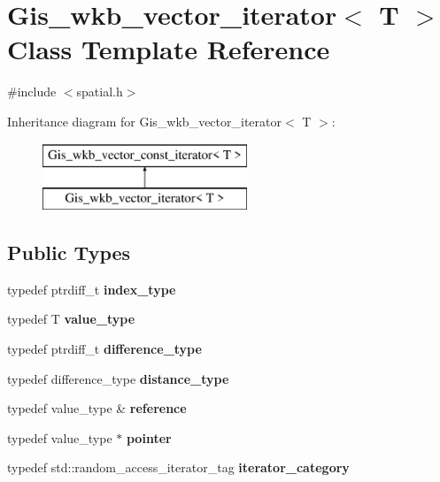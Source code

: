 \hypertarget{classGis__wkb__vector__iterator}{}\section{Gis\+\_\+wkb\+\_\+vector\+\_\+iterator$<$ T $>$ Class Template Reference}
\label{classGis__wkb__vector__iterator}


{\ttfamily \#include $<$spatial.\+h$>$}

Inheritance diagram for Gis\+\_\+wkb\+\_\+vector\+\_\+iterator$<$ T $>$\+:\begin{figure}[H]
\begin{center}
\leavevmode
\includegraphics[height=2.000000cm]{classGis__wkb__vector__iterator}
\end{center}
\end{figure}
\subsection*{Public Types}
\begin{DoxyCompactItemize}
\item 
\mbox{\label{classGis__wkb__vector__iterator_a12ac1d1af0833c06145cc64739daa482}} 
typedef ptrdiff\+\_\+t {\bfseries index\+\_\+type}
\item 
\mbox{\label{classGis__wkb__vector__iterator_aee6d535402352e23d792e32fc7aad13b}} 
typedef T {\bfseries value\+\_\+type}
\item 
\mbox{\label{classGis__wkb__vector__iterator_ab1b2f7afd1da0006c6e518492fdc791a}} 
typedef ptrdiff\+\_\+t {\bfseries difference\+\_\+type}
\item 
\mbox{\label{classGis__wkb__vector__iterator_a03a5070e54e90929c6421626a19f28f0}} 
typedef difference\+\_\+type {\bfseries distance\+\_\+type}
\item 
\mbox{\label{classGis__wkb__vector__iterator_a1f09af6a6bc4a89a4fbe20a26946b602}} 
typedef value\+\_\+type \& {\bfseries reference}
\item 
\mbox{\label{classGis__wkb__vector__iterator_a4003ce5f4f12aa413dc843e007459fec}} 
typedef value\+\_\+type $\ast$ {\bfseries pointer}
\item 
\mbox{\label{classGis__wkb__vector__iterator_a41650caa85e1e20f7af3515df356ae4f}} 
typedef std\+::random\+\_\+access\+\_\+iterator\+\_\+tag {\bfseries iterator\+\_\+category}
\end{DoxyCompactItemize}
